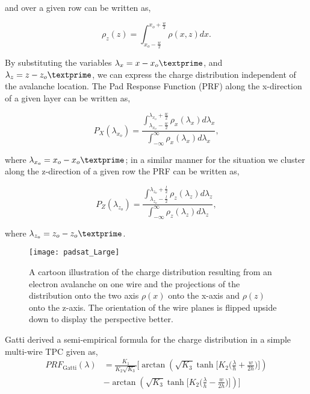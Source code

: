 and over a given row can be written as,

\begin{equation}
\rho_z(z) = \int_{x_o - \frac{w}{2}}^{x_o + \frac{w}{2}} \rho(x,z)dx.
\end{equation}

By substituting the variables  $\lambda_x = x - x_o\textprime$, and $\lambda_z = z - z_o\textprime$, we can express the charge distribution independent of the avalanche location. The Pad Response Function (PRF) along the x-direction of a given layer can be written as,

\begin{equation}
P_X(\lambda_{x_o}) = \frac{ \int_{\lambda_{x_o}-\frac{w}{2}}^{\lambda_{x_o} + \frac{w}{2}} \rho_x(\lambda_x)d\lambda_x } {\int_{-\infty}^\infty \rho_x(\lambda_x)d\lambda_x     },
\label{eq:prflayer}
\end{equation}

where $\lambda_{x_o} = x_o - x_o\textprime$; in a similar manner for the situation we cluster along the z-direction  of a given row the PRF can be written as,

\begin{equation}
P_Z(\lambda_{z_o}) = \frac{ \int_{\lambda_{z_o}-\frac{l}{2}}^{\lambda_{z_o} + \frac{l}{2}} \rho_z(\lambda_z)d\lambda_z }{\int_{-\infty}^\infty \rho_z(\lambda_z)d\lambda_z  },
\label{eq:prfrow}
\end{equation}

where $\lambda_{z_o} = z_o - z_o\textprime$.


\begin{figure}[!htb]
\texttt{[image: padsat\_Large]}
\caption{A cartoon illustration of the charge distribution resulting from an electron avalanche on one wire and the projections of the distribution onto the two axis $\rho(x)$ onto the x-axis and $\rho(z)$ onto the z-axis. The orientation of the wire planes is flipped upside down to display the perspective better.}
\label{fig:2DPRF}
\end{figure}

Gatti \cite{gatti} derived a semi-empirical formula for the charge distribution in a simple multi-wire TPC given as, 
\begin{equation}\label{eq:gatti}
\begin{split}
PRF_{\mathrm{Gatti}}(\lambda)
& = \frac{K_{1}}{K_{2}\sqrt{K_{3}}}\bigl[\arctan(\sqrt{K_{3}}\tanh\bigl[K_{2}\bigl(\frac{\lambda}{h}+\frac{w}{2h}\bigr)\bigr]) \\
& - \arctan(\sqrt{K_{3}}\tanh\bigl[K_{2}\bigl(\frac{\lambda}{h}-\frac{w}{2h}\bigr)\bigr])\bigr] \\
\end{split}
\end{equation}

